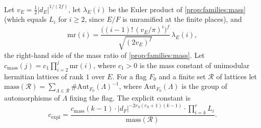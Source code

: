 \begin{definition}\label{pf:multnc:def-cexpl}
Let $v_E=\frac12|d_E|^{1/(2f)}$, let $\lambda_E(i)$ be the Euler product of \cref{prop:families:mass} (which equals $L_i$ for
$i\ge2$, since $E/F$ is unramified at the finite places), and
\begin{equation}\label{pf:multnc:eq-mr}
\mathrm{mr}(i)=\frac{\bigl((i-1)!\,(v_E/\pi)^i\bigr)^{f}}{\sqrt{(2v_E)^{f}}}\,\lambda_E(i),
\end{equation}
the right-hand side of the mass ratio of \cref{prop:families:mass}. Let $c_{\mathrm{mass}}(j)=c_1\prod_{i=2}^{j}\mathrm{mr}(i)$,
where $c_1>0$ is the mass constant of unimodular hermitian lattices of rank $1$ over $E$. For a flag $F_0$ and a finite set
$\mathcal R$ of lattices let $\mathrm{mass}(\mathcal R)=\sum_{\Lambda\in\mathcal R}\#\mathrm{Aut}_{F_0}(\Lambda)^{-1}$,
where $\mathrm{Aut}_{F_0}(\Lambda)$ is the group of automorphisms of $\Lambda$ fixing the flag. The explicit constant is
\begin{equation}\label{pf:multnc:eq-cexpl}
c_{\mathrm{expl}}=\frac{c_{\mathrm{mass}}(k-1)\cdot|d_F|^{-2r_S(r_S+1)(k-1)}\cdot\prod_{i=k}^{r}L_i}{\mathrm{mass}(\mathcal R)}.
\end{equation}
\end{definition}


